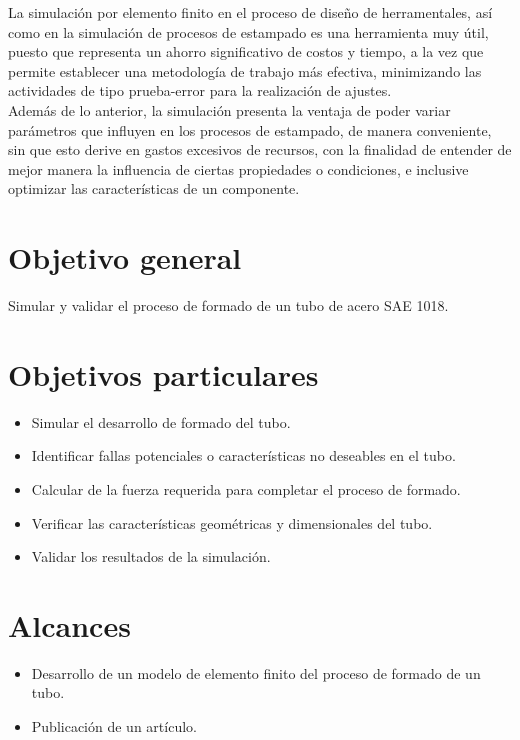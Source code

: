 La simulación por elemento finito en el proceso de diseño de herramentales, así como en 
la simulación de procesos de estampado es una herramienta muy útil, puesto que representa un ahorro 
significativo de costos y tiempo, a la vez que permite establecer una metodología de trabajo más efectiva, minimizando las 
actividades de tipo prueba-error para la realización de ajustes.\\

Además de lo anterior, la simulación presenta la ventaja de poder variar parámetros que influyen en los procesos de 
estampado, de manera conveniente, sin que esto derive en gastos excesivos de recursos, con la finalidad de entender 
de mejor manera la influencia de ciertas propiedades o condiciones, e inclusive optimizar las características 
de un componente.



\section{Objetivo general}

Simular y validar el proceso de formado de un tubo de acero SAE 1018.

\section{Objetivos particulares}
\begin{itemize}
\item Simular el desarrollo de formado del tubo.
\item Identificar fallas potenciales o características no deseables en el tubo.
\item Calcular de la fuerza requerida para completar el proceso de formado.
\item Verificar las características geométricas y dimensionales del tubo.
\item Validar los resultados de la simulación.
\end{itemize}


\section{Alcances}
\begin{itemize}
\item Desarrollo de un modelo de elemento finito del proceso de formado de un tubo.
\item Publicación de un artículo.
\end{itemize}

